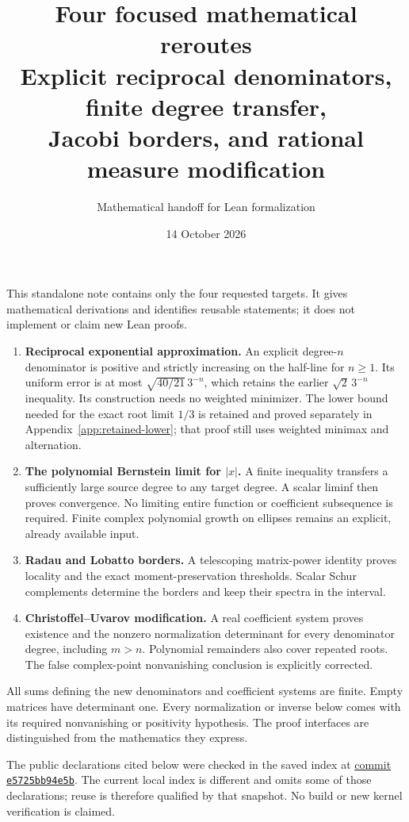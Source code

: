 \documentclass[11pt,a4paper]{article}
\title{Four focused mathematical reroutes\\
Explicit reciprocal denominators, finite degree transfer,\\
Jacobi borders, and rational measure modification}
\author{Mathematical handoff for Lean formalization}
\date{14 October 2026}
\theoremstyle{definition}
\begin{document}
\maketitle

This standalone note contains only the four requested targets. It gives
mathematical derivations and identifies reusable statements; it does not
implement or claim new Lean proofs.

\begin{enumerate}[leftmargin=*]
\item \textbf{Reciprocal exponential approximation.} An explicit degree-$n$
denominator is positive and strictly increasing on the half-line for $n\ge1$.
Its uniform error is at most $\sqrt{40/21}\,3^{-n}$, which retains the earlier
$\sqrt2\,3^{-n}$ inequality. Its construction needs no weighted minimizer.
The lower bound needed for the exact root limit $1/3$ is retained and proved
separately in Appendix~\ref{app:retained-lower}; that proof still uses weighted
minimax and alternation.
\item \textbf{The polynomial Bernstein limit for $|x|$.} A finite inequality
transfers a sufficiently large source degree to any target degree. A scalar
liminf then proves convergence. No limiting entire function or coefficient
subsequence is required. Finite complex polynomial growth on ellipses remains
an explicit, already available input.
\item \textbf{Radau and Lobatto borders.} A telescoping matrix-power identity
proves locality and the exact moment-preservation thresholds. Scalar Schur
complements determine the borders and keep their spectra in the interval.
\item \textbf{Christoffel--Uvarov modification.} A real coefficient system
proves existence and the nonzero normalization determinant for every
denominator degree, including $m>n$. Polynomial remainders also cover repeated
roots. The false complex-point nonvanishing conclusion is explicitly corrected.
\end{enumerate}

All sums defining the new denominators and coefficient systems are finite.
Empty matrices have determinant one. Every normalization or inverse below
comes with its required nonvanishing or positivity hypothesis. The proof
interfaces are distinguished from the mathematics they express.

The public declarations cited below were checked in the saved index at
\href{https://github.com/tchen-research/NLAlib/tree/e5725bb94e5bd8e326d58ad219260b0218e74c9e}
{commit \texttt{e5725bb94e5b}}. The current local index is different and omits
some of those declarations; reuse is therefore qualified by that snapshot.
No build or new kernel verification is claimed.
\end{document}
